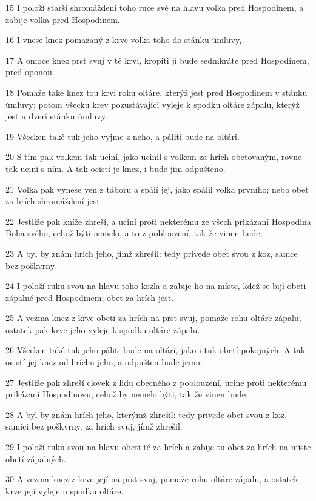 \par 15 I položí starší shromáždení toho ruce své na hlavu volka pred Hospodinem, a zabije volka pred Hospodinem.
\par 16 I vnese knez pomazaný z krve volka toho do stánku úmluvy,
\par 17 A omoce knez prst svuj v té krvi, kropiti jí bude sedmkráte pred Hospodinem, pred oponou.
\par 18 Pomaže také knez tou krví rohu oltáre, kterýž jest pred Hospodinem v stánku úmluvy; potom všecku krev pozustávající vyleje k spodku oltáre zápalu, kterýž jest u dverí stánku úmluvy.
\par 19 Všecken také tuk jeho vyjme z neho, a páliti bude na oltári.
\par 20 S tím pak volkem tak uciní, jako ucinil s volkem za hrích obetovaným, rovne tak uciní s ním. A tak ocistí je knez, i bude jim odpušteno.
\par 21 Volka pak vynese ven z táboru a spálí jej, jako spálil volka prvního; nebo obet za hrích shromáždení jest.
\par 22 Jestliže pak kníže zhreší, a uciní proti nekterému ze všech prikázaní Hospodina Boha svého, cehož býti nemelo, a to z poblouzení, tak že vinen bude,
\par 23 A byl by znám hrích jeho, jímž zhrešil: tedy privede obet svou z koz, samce bez poškvrny.
\par 24 I položí ruku svou na hlavu toho kozla a zabije ho na míste, kdež se bijí obeti zápalné pred Hospodinem; obet za hrích jest.
\par 25 A vezma knez z krve obeti za hrích na prst svuj, pomaže rohu oltáre zápalu, ostatek pak krve jeho vyleje k spodku oltáre zápalu.
\par 26 Všecken také tuk jeho páliti bude na oltári, jako i tuk obetí pokojných. A tak ocistí jej knez od hríchu jeho, a odpušten bude jemu.
\par 27 Jestliže pak zhreší clovek z lidu obecného z poblouzení, ucine proti nekterému prikázaní Hospodinovu, cehož by nemelo býti, tak že vinen bude,
\par 28 A byl by znám hrích jeho, kterýmž zhrešil: tedy privede obet svou z koz, samici bez poškvrny, za hrích svuj, jímž zhrešil.
\par 29 I položí ruku svou na hlavu obeti té za hrích a zabije tu obet za hrích na míste obetí zápalných.
\par 30 A vezma knez z krve její na prst svuj, pomaže rohu oltáre zápalu, a ostatek krve její vyleje u spodku oltáre.
